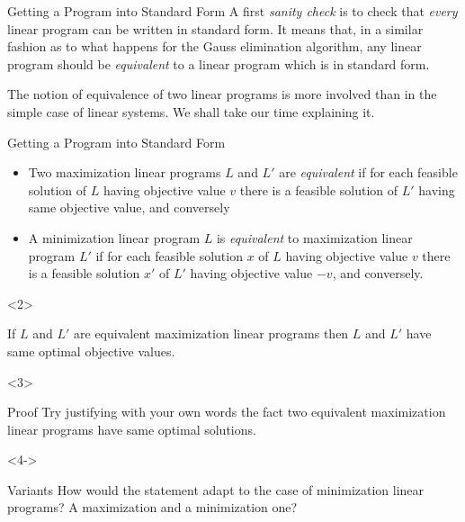 \documentclass[32pt, aspectratio = 169]{beamer}
\begin{document}
\begin{frame}{Getting a Program into Standard Form}
  A first \textit{sanity check} is to check that \emph{every} linear
  program can be written in standard form. It means that, in a similar
  fashion as to what happens for the Gauss elimination algorithm, any
  linear program should be \textit{equivalent} to a linear program
  which is in standard form.

  The notion of equivalence of two linear programs is more involved
  than in the simple case of linear systems. We shall take our time
  explaining it.
\end{frame}

\begin{frame}{Getting a Program into Standard Form}
  \begin{defn}
    \begin{itemize}
    \item[\textbullet]
      Two maximization linear programs $L$ and $L'$ are
      \emph{equivalent} if for each feasible solution of $L$
      having objective value $v$ there is a feasible solution of
      $L'$ having same objective value, and conversely
    \item[\textbullet]
      A minimization linear program $L$ is \emph{equivalent} to
      maximization linear program $L'$ if for each feasible
      solution $x$ of $L$ having objective value $v$ there is a
      feasible solution $x'$ of $L'$ having objective value $-v$,
      and conversely.
    \end{itemize}
  \end{defn}
  \begin{overlayarea}{\textwidth}{.3\textheight}
    \vspace{-1em}
    \begin{onlyenv}<2>
      \begin{prop}
        If $L$ and $L'$ are equivalent maximization linear programs
        then $L$ and $L'$ have same optimal objective values.
      \end{prop}
    \end{onlyenv}
    \begin{onlyenv}<3>
      \vspace{1em}
      \begin{halfshyblock}{Proof}
        Try justifying with your own words the fact two equivalent
        maximization linear programs have same optimal solutions.
      \end{halfshyblock}
    \end{onlyenv}
    \begin{onlyenv}<4->
      \vspace{1em}
      \begin{halfshyblock}{Variants}
        How would the statement adapt to the case of minimization
        linear programs? A maximization and a minimization one?
      \end{halfshyblock}
    \end{onlyenv}
  \end{overlayarea}
\end{frame}
\end{document}
